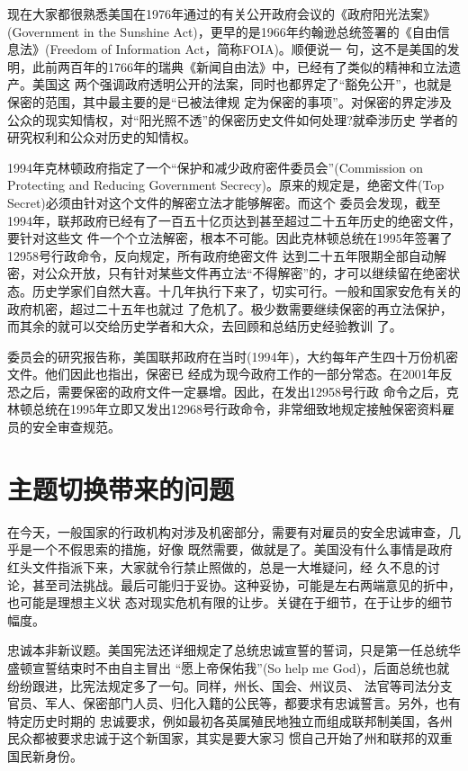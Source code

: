 \documentclass[10pt]{article}
\begin{document}
{现在大家都很熟悉美国在1976年通过的有关公开政府会议的《政府阳光法案》(Government in the Sunshine
Act)，更早的是1966年约翰逊总统签署的《自由信息法》(Freedom of Information Act，简称FOIA)。顺便说一
句，这不是美国的发明，此前两百年的1766年的瑞典《新闻自由法》中，已经有了类似的精神和立法遗产。美国这
两个强调政府透明公开的法案，同时也都界定了``豁免公开''，也就是保密的范围，其中最主要的是``已被法律规
定为保密的事项''。对保密的界定涉及公众的现实知情权，对``阳光照不透''的保密历史文件如何处理?就牵涉历史
学者的研究权利和公众对历史的知情权。

1994年克林顿政府指定了一个``保护和减少政府密件委员会''(Commission on Protecting and Reducing
Government Secrecy)。原来的规定是，绝密文件(Top Secret)必须由针对这个文件的解密立法才能够解密。而这个
委员会发现，截至1994年，联邦政府已经有了一百五十亿页达到甚至超过二十五年历史的绝密文件，要针对这些文
件一个个立法解密，根本不可能。因此克林顿总统在1995年签署了12958号行政命令，反向规定，所有政府绝密文件
达到二十五年限期全部自动解密，对公众开放，只有针对某些文件再立法``不得解密''的，才可以继续留在绝密状
态。历史学家们自然大喜。十几年执行下来了，切实可行。一般和国家安危有关的政府机密，超过二十五年也就过
了危机了。极少数需要继续保密的再立法保护，而其余的就可以交给历史学者和大众，去回顾和总结历史经验教训
了。

委员会的研究报告称，美国联邦政府在当时(1994年)，大约每年产生四十万份机密文件。他们因此也指出，保密已
经成为现今政府工作的一部分常态。在2001年反恐之后，需要保密的政府文件一定暴增。因此，在发出12958号行政
命令之后，克林顿总统在1995年立即又发出12968号行政命令，非常细致地规定接触保密资料雇员的安全审查规范。


\pagebreak
\section{主题切换带来的问题}

在今天，一般国家的行政机构对涉及机密部分，需要有对雇员的安全忠诚审查，几乎是一个不假思索的措施，好像
既然需要，做就是了。美国没有什么事情是政府红头文件指派下来，大家就令行禁止照做的，总是一大堆疑问，经
久不息的讨论，甚至司法挑战。最后可能归于妥协。这种妥协，可能是左右两端意见的折中，也可能是理想主义状
态对现实危机有限的让步。关键在于细节，在于让步的细节幅度。

忠诚本非新议题。美国宪法还详细规定了总统忠诚宣誓的誓词，只是第一任总统华盛顿宣誓结束时不由自主冒出
``愿上帝保佑我''(So help me God)，后面总统也就纷纷跟进，比宪法规定多了一句。同样，州长、国会、州议员、
法官等司法分支官员、军人、保密部门人员、归化入籍的公民等，都要求有忠诚誓言。另外，也有特定历史时期的
忠诚要求，例如最初各英属殖民地独立而组成联邦制美国，各州民众都被要求忠诚于这个新国家，其实是要大家习
惯自己开始了州和联邦的双重国民新身份。

}
\end{document}

